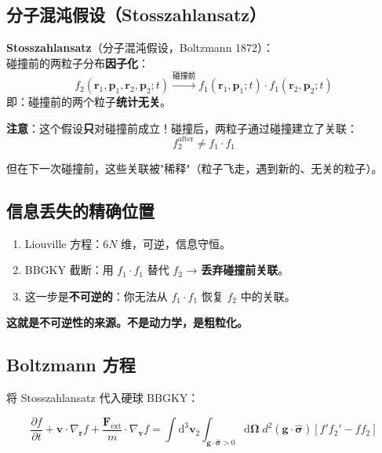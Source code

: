 \documentclass[11pt,a4paper]{article}
\newcommand{\ri}{\mathbf{r}}
\newcommand{\piu}{\mathbf{p}}
\newcommand{\vi}{\mathbf{v}}
\newcommand{\Om}{\boldsymbol{\Omega}}
\begin{document}
\subsection{分子混沌假设（Stosszahlansatz）}

\begin{tcolorbox}[colback=red!5, title=核心假设]
\textbf{Stosszahlansatz}（分子混沌假设，Boltzmann 1872）：\\
碰撞前的两粒子分布\textbf{因子化}：
\begin{equation}
f_2(\ri_1,\piu_1,\ri_2,\piu_2;t) \xrightarrow{\text{碰撞前}} f_1(\ri_1,\piu_1;t)\cdot f_1(\ri_2,\piu_2;t)
\end{equation}
即：碰撞前的两个粒子\textbf{统计无关}。
\end{tcolorbox}

\textbf{注意}：这个假设\textbf{只}对碰撞前成立！碰撞后，两粒子通过碰撞建立了关联：
\begin{equation}
f_2^{\text{after}} \neq f_1 \cdot f_1
\end{equation}

但在下一次碰撞前，这些关联被"稀释"（粒子飞走，遇到新的、无关的粒子）。

\subsection{信息丢失的精确位置}

\begin{enumerate}
\item Liouville 方程：$6N$ 维，可逆，信息守恒。
\item BBGKY 截断：用 $f_1 \cdot f_1$ 替代 $f_2$ → \textbf{丢弃碰撞前关联}。
\item 这一步是\textbf{不可逆的}：你无法从 $f_1\cdot f_1$ 恢复 $f_2$ 中的关联。
\end{enumerate}

\textbf{这就是不可逆性的来源。不是动力学，是粗粒化。}

\subsection{Boltzmann 方程}

将 Stosszahlansatz 代入硬球 BBGKY：

\begin{equation}
\boxed{\frac{\partial f}{\partial t} + \vi\cdot\nabla_{\ri} f + \frac{\mathbf{F}_{\text{ext}}}{m}\cdot\nabla_{\vi} f = \int\mathrm{d}^3\vi_2\int_{\mathbf{g}\cdot\hat{\boldsymbol{\sigma}}>0}\mathrm{d}\Om\; d^2(\mathbf{g}\cdot\hat{\boldsymbol{\sigma}})\left[f'f_2' - ff_2\right]}
\end{equation}
\end{document}
